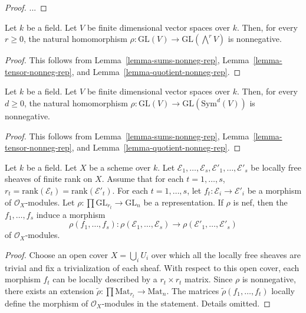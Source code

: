\begin{proof}
...
\end{proof}

\begin{lemma}
\label{lemma-wedge-nonneg-rep}
Let $k$ be a field.
Let $V$ be finite dimensional vector spaces over $k$.
Then, for every $r \geq 0$, the natural homomorphism
$\rho : \mathrm{GL}(V) \to \mathrm{GL}(\bigwedge^r V)$
is nonnegative.
\end{lemma}

\begin{proof}
This follows from
Lemma~\ref{lemma-sums-nonneg-rep},
Lemma~\ref{lemma-tensor-nonneg-rep}, and
Lemma~\ref{lemma-quotient-nonneg-rep}.
\end{proof}

\begin{lemma}
\label{lemma-sym-nonneg-rep}
Let $k$ be a field.
Let $V$ be finite dimensional vector spaces over $k$.
Then, for every $d \geq 0$, the natural homomorphism
$\rho : \mathrm{GL}(V) \to \mathrm{GL}(\mathrm{Sym}^d(V))$
is nonnegative.
\end{lemma}

\begin{proof}
This follows from
Lemma~\ref{lemma-sums-nonneg-rep},
Lemma~\ref{lemma-tensor-nonneg-rep}, and
Lemma~\ref{lemma-quotient-nonneg-rep}.
\end{proof}

\begin{lemma}
\label{lemma-nonneg-tensor-morphisms}
Let $k$ be a field.
Let $X$ be a scheme over $k$.
Let
$\mathcal{E}_1,\ldots,\mathcal{E}_s,\mathcal{E}'_1,\ldots,\mathcal{E}'_s$
be locally free sheaves of finite rank on $X$.
Assume that for each $t = 1,\ldots,s$,
$r_t = \mathrm{rank}(\mathcal{E}_t) = \mathrm{rank}(\mathcal{E}'_t)$.
For each $t = 1,\ldots,s$, let $f_t : \mathcal{E}_i \to \mathcal{E}'_i$ be a
morphism of $\mathcal{O}_X$-modules.
Let $\rho : \prod \mathrm{GL}_{r_t} \to \mathrm{GL}_n$ be a representation.
If $\rho$ is nef, then the $f_1,\ldots,f_s$ induce a morphism
$$
  \rho(f_1,\ldots,f_s) :
    \rho(\mathcal{E}_1,\ldots,\mathcal{E}_s) \to
    \rho(\mathcal{E}'_1,\dots,\mathcal{E}'_s)
$$
of $\mathcal{O}_X$-modules.
\end{lemma}

\begin{proof}
Choose an open cover $X = \bigcup_i U_i$ over which all the locally free
sheaves are trivial and fix a trivialization of each sheaf.
With respect to this open cover, each morphism $f_t$ can be locally described
by a $r_t \times r_t$ matrix.
Since $\rho$ is nonnegative, there exists an extension
$\tilde\rho : \prod \mathrm{Mat}_{r_t} \to \mathrm{Mat}_n$.
The matrices $\tilde\rho(f_1,\ldots,f_t)$ locally define the morphism of
$\mathcal{O}_X$-modules in the statement.
Details omitted.
\end{proof}

